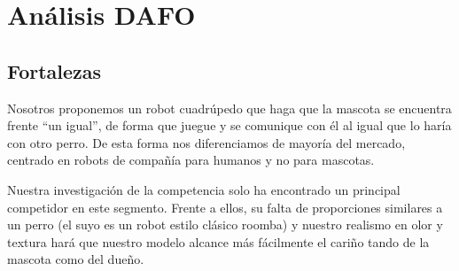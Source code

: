 \section{Análisis DAFO}  

\begin{figure}[H]
    \centering
\end{figure}

\subsection{Fortalezas}

Nosotros proponemos un robot cuadrúpedo que haga que la mascota se encuentra frente ``un igual'', de forma que juegue y se comunique con él al igual que lo haría con otro perro. De esta forma nos diferenciamos de mayoría del mercado, centrado en robots de compañía para humanos y no para mascotas. 

Nuestra investigación de la competencia solo ha encontrado un principal competidor en este segmento. Frente a ellos, su falta de proporciones similares a un perro (el suyo es un robot estilo clásico roomba) y nuestro realismo en olor y textura hará que nuestro modelo alcance más fácilmente el cariño tando de la mascota como del dueño.

